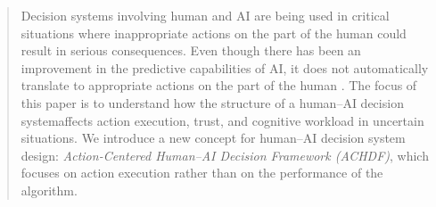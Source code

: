 \documentclass[journal]{IEEEtran}
\theoremstyle{plain}
\theoremstyle{definition}
\providecommand{\DIFdeltex}[1]{{\protect\color{red} \scriptsize #1}} %
\providecommand{\DIFdelbegin}{} %
\providecommand{\DIFdel}[1]{\texorpdfstring{\DIFdeltex{#1}}{}} %
\newcommand{\DIFscaledelfig}{0.5}
\newlength{\DIFdelgraphicswidth} %
\newlength{\DIFdelgraphicsheight} %
\newcommand{\DIFdelincludegraphics}[2][]{%
\sbox{\DIFdelgraphicsbox}{\DIFOincludegraphics[#1]{#2}}%
\settoboxwidth{\DIFdelgraphicswidth}{\DIFdelgraphicsbox} %
\settoboxtotalheight{\DIFdelgraphicsheight}{\DIFdelgraphicsbox} %
\scalebox{\DIFscaledelfig}{%
\parbox[b]{\DIFdelgraphicswidth}{\usebox{\DIFdelgraphicsbox}\\[-\baselineskip] \rule{\DIFdelgraphicswidth}{0em}}\llap{\resizebox{\DIFdelgraphicswidth}{\DIFdelgraphicsheight}{%
\setlength{\unitlength}{\DIFdelgraphicswidth}%
\begin{picture}(1,1)%
\thicklines\linethickness{2pt} %
{\color[rgb]{1,0,0}\put(0,0){\framebox(1,1){}}}%
{\color[rgb]{1,0,0}\put(0,0){\line( 1,1){1}}}%
{\color[rgb]{1,0,0}\put(0,1){\line(1,-1){1}}}%
\end{picture}%
}\hspace*{3pt}}} %
} %
\DeclareRobustCommand{\DIFdelbegin}{\DIFOdelbegin \let\includegraphics\DIFdelincludegraphics} %
\begin{document}
    \begin{abstract}
        \DIFdelbegin \DIFdel{Decision systems involving human and AI are being used in critical situations where inappropriate actions on the part of the human could result in serious consequences. Even though there has been an improvement in the predictive capabilities of AI, it does not automatically translate to appropriate actions on the part of the human . The focus of this paper is to understand how the structure of a human--AI decision systemaffects action execution, trust, and cognitive workload in uncertain situations.
        We introduce a new concept for human--AI decision system design: \emph{Action-Centered Human--AI Decision Framework (ACHDF)}, which focuses on action execution rather than on the performance of the algorithm.
}
\end{abstract}
\end{document}
